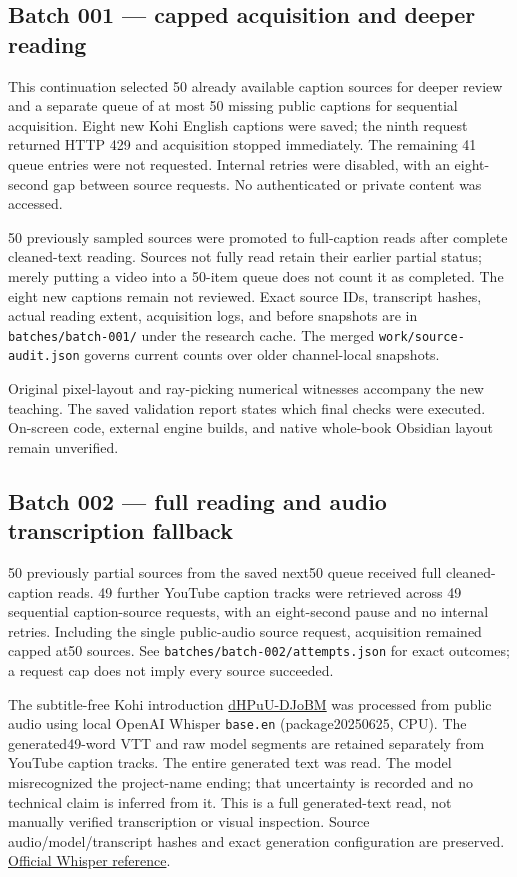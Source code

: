 \subsection{Batch 001 --- capped acquisition and deeper reading}\label{batch-001-capped-acquisition-and-deeper-reading}

This continuation selected 50 already available caption sources for deeper review and a separate queue of at most 50 missing public captions for sequential acquisition. Eight new Kohi English captions were saved; the ninth request returned HTTP 429 and acquisition stopped immediately. The remaining 41 queue entries were not requested. Internal retries were disabled, with an eight-second gap between source requests. No authenticated or private content was accessed.

50 previously sampled sources were promoted to full-caption reads after complete cleaned-text reading. Sources not fully read retain their earlier partial status; merely putting a video into a 50-item queue does not count it as completed. The eight new captions remain not reviewed. Exact source IDs, transcript hashes, actual reading extent, acquisition logs, and before snapshots are in \texttt{batches/batch-001/} under the research cache. The merged \texttt{work/source-audit.json} governs current counts over older channel-local snapshots.

Original pixel-layout and ray-picking numerical witnesses accompany the new teaching. The saved validation report states which final checks were executed. On-screen code, external engine builds, and native whole-book Obsidian layout remain unverified.

\subsection{Batch 002 --- full reading and audio transcription fallback}\label{batch-002-full-reading-and-audio-transcription-fallback}

50 previously partial sources from the saved next50 queue received full cleaned-caption reads. 49 further YouTube caption tracks were retrieved across 49 sequential caption-source requests, with an eight-second pause and no internal retries. Including the single public-audio source request, acquisition remained capped at50 sources. See \texttt{batches/batch-002/attempts.json} for exact outcomes; a request cap does not imply every source succeeded.

The subtitle-free Kohi introduction \href{https://www.youtube.com/watch?v=dHPuU-DJoBM}{dHPuU-DJoBM} was processed from public audio using local OpenAI Whisper \texttt{base.en} (package20250625, CPU). The generated49-word VTT and raw model segments are retained separately from YouTube caption tracks. The entire generated text was read. The model misrecognized the project-name ending; that uncertainty is recorded and no technical claim is inferred from it. This is a full generated-text read, not manually verified transcription or visual inspection. Source audio/model/transcript hashes and exact generation configuration are preserved. \href{https://github.com/openai/whisper}{Official Whisper reference}.


